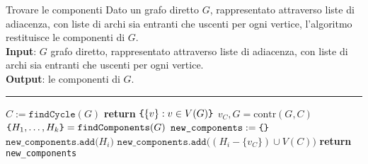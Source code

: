 \documentclass[a4paper, 12pt]{report}
\begin{document}
    \begin{framedalgo}{Trovare le componenti}
        Dato un grafo diretto $G$, rappresentato attraverso liste di adiacenza, con liste di archi sia entranti che uscenti per ogni vertice, l'algoritmo restituisce le componenti di $G$.\\
        \textbf{Input}: $G$ grafo diretto, rappresentato attraverso liste di adiacenza, con liste di archi sia entranti che uscenti per ogni vertice.\\
        \textbf{Output}: le componenti di $G$.

        \hrule
        \begin{algorithmic}[1]
                \State $C := \texttt{findCycle}(G)$
                    \State \textbf{return} $\verb|{|\{v\} : v \in V(G)\verb|}|$ 
                \Else
                    \State $v_C, G = \mathrm{contr}(G, C)$ 
                    \State $\verb|{|H_1, \ldots, H_k\verb|}| = \texttt{findComponents}(G)$
                    \State $\texttt{new\_components} := \verb|{|\verb|}|$ 
                            \State $\texttt{new\_components.add(}H_i\texttt{)}$
                        \Else
                        \State $\texttt{new\_components.add(}(H_i - \{v_C\}) \cup V(C)\texttt{)}$
                        \EndIf
                    \EndFor
                \EndIf
                \State \textbf{return} \texttt{new\_components}
            \EndFunction
        \end{algorithmic}
    \end{framedalgo}
\end{document}
